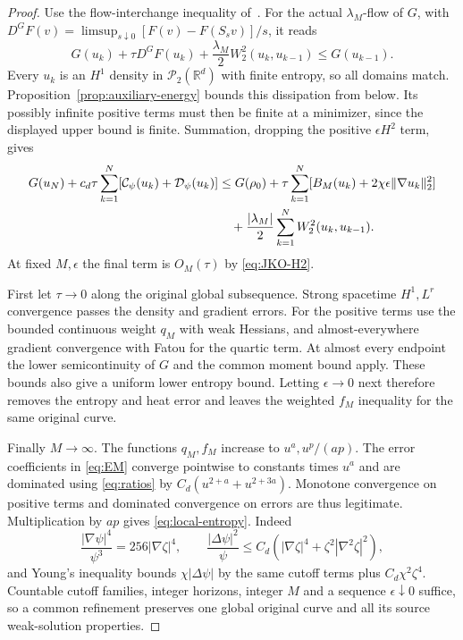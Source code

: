 \documentclass[11pt]{article}
\numberwithin{equation}{section}
\theoremstyle{definition}
\theoremstyle{remark}
\newcommand{\R}{\mathbb R}
\newcommand{\Ptwo}{\mathcal P_2(\R^d)}
\newcommand{\norm}[1]{\lVert #1\rVert}
\newcommand{\Cpsi}{\mathcal C_\psi}
\newcommand{\Dpsi}{\mathcal D_\psi}
\begin{document}
\begin{proof}
Use the flow-interchange inequality
of~\cite[Theorem~3.2, (3.21)]{MMS}. For the actual $\lambda_M$-flow of $G$,
with
$D^GF(v)=\limsup_{s\downarrow0}[F(v)-F(S_sv)]/s$, it reads
\[
 G(u_k)+\tau D^GF(u_k)
       +\frac{\lambda_M}{2}W_2^2(u_k,u_{k-1})\le G(u_{k-1}).
\]
Every $u_k$ is an $H^1$ density in $\Ptwo$ with finite entropy, so all
domains match. Proposition~\ref{prop:auxiliary-energy} bounds this
dissipation from below. Its possibly infinite positive terms must then
be finite at a minimizer, since the displayed upper bound is finite.
Summation, dropping the positive $\epsilon H^2$ term, gives
\begin{align}\label{eq:interchange}
 G(u_N)+c_d\tau\sum_{k=1}^N[\Cpsi(u_k)+\Dpsi(u_k)]
 &\le G(\rho_0)
   +\tau\sum_{k=1}^N[B_M(u_k)+2\chi\epsilon\norm{\nabla u_k}_2^2]
       \notag\\
 &\quad+\frac{|\lambda_M|}{2}\sum_{k=1}^NW_2^2(u_k,u_{k-1}).
\end{align}
At fixed $M,\epsilon$ the final term is $O_M(\tau)$ by
\eqref{eq:JKO-H2}.

First let $\tau\to0$ along the original global subsequence. Strong
spacetime $H^1,L^r$ convergence passes the density and gradient errors.
For the positive terms use the bounded continuous weight $q_M$ with weak
Hessians, and almost-everywhere gradient convergence with Fatou for the
quartic term. At almost every endpoint the lower semicontinuity of $G$
and the common moment bound apply. These bounds also give a uniform lower
entropy bound. Letting $\epsilon\to0$ next therefore removes the entropy
and heat error and leaves the weighted $f_M$ inequality for the same
original curve.

Finally $M\to\infty$. The functions $q_M,f_M$ increase to $u^a,u^p/(ap)$.
The error coefficients in \eqref{eq:EM} converge pointwise to constants
times $u^a$ and are dominated using \eqref{eq:ratios} by
$C_d(u^{2+a}+u^{2+3a})$. Monotone convergence on positive terms and
dominated convergence on errors are thus legitimate. Multiplication by
$ap$ gives \eqref{eq:local-entropy}. Indeed
\[
 \frac{|\nabla\psi|^4}{\psi^3}=256|\nabla\zeta|^4,\qquad
 \frac{|\Delta\psi|^2}{\psi}
       \le C_d(|\nabla\zeta|^4+\zeta^2|\nabla^2\zeta|^2),
\]
and Young's inequality bounds $\chi|\Delta\psi|$ by the same cutoff
terms plus $C_d\chi^2\zeta^4$.
Countable cutoff families, integer horizons, integer $M$ and a sequence
$\epsilon\downarrow0$ suffice, so a common refinement preserves one
global original curve and all its source weak-solution properties.
\end{proof}
\end{document}
